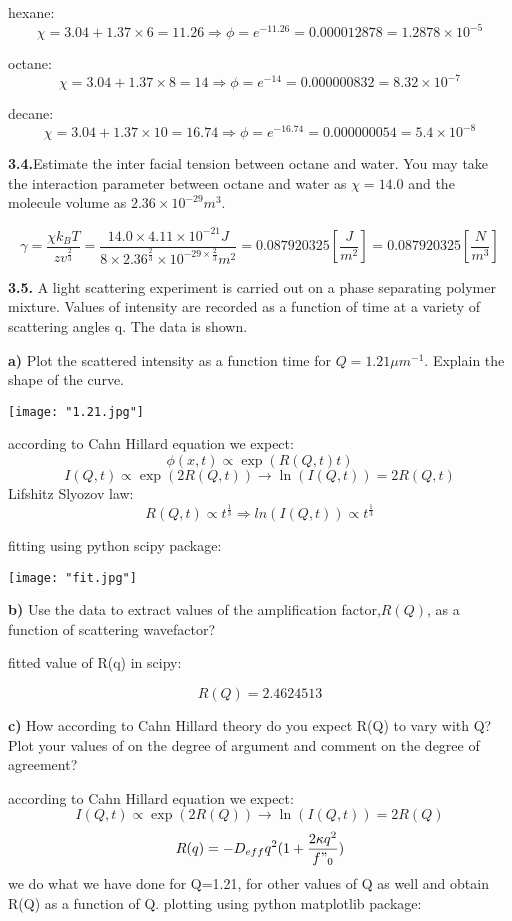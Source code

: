 \documentclass[a4paper,12pt]{report}
\begin{document}
hexane: \[
\chi = 3.04 + 1.37\times 6 = 11.26\Rightarrow \phi =
 e^{-11.26} = 0.000012878 =1.2878 \times 10^{-5}
\]

octane: \[
\chi = 3.04 + 1.37\times 8 = 14\Rightarrow \phi =
 e^{-14} = 0.000000832 = 8.32 \times 10^{-7}
\]

decane: \[
\chi = 3.04 + 1.37\times 10 = 16.74
\Rightarrow \phi = e^{-16.74} = 0.000000054 = 5.4\times 10^{-8}
\]

\textbf{3.4.}Estimate the inter facial tension between octane and water.
 You may take the interaction parameter between octane and 
 water as $\chi=14.0$ and the molecule volume as $2.36 \times 10^{-29} m^3$.

\[
\gamma =\frac{\chi k_B T}{z v^{\frac{2}{3}}} = 
\frac{14.0 \times 4.11 \times 10^{-21}J}{8 \times 2.36^{\frac{2}{3}} \times 10^{-29 \times \frac{2}{3} }m^2} = 0.087920325 [\frac{J}{m^2}] = 0.087920325 [\frac{N}{m^3}]
\]

\textbf{3.5.} A light scattering experiment is carried out on a phase separating polymer mixture.
 Values of intensity are recorded as a function of time at a variety of scattering angles q.
  The data is shown.

\textbf{a)} Plot the scattered intensity as a function time for $ Q = 1.21 \mu m^{-1}$.
 Explain the shape of the curve.

\texttt{[image: "1.21.jpg"]}

according to Cahn Hillard equation we expect:
\[
\phi(x,t) \propto \exp(R(Q,t)t)
\]
\[
I(Q,t) \propto \exp(2R(Q,t)) \to \ln(I(Q,t)) =2R(Q,t)
\]
Lifshitz Slyozov law:
\[
R(Q,t) \propto t^{\frac{1}{3}} \Rightarrow ln(I(Q,t)) \propto t^{\frac{1}{3}}
\]

fitting using python scipy package:

\texttt{[image: "fit.jpg"]}

\textbf{b)} Use the data to extract values of the amplification factor,$R(Q)$,
 as a function of scattering wavefactor?


fitted value of R(q) in scipy:

\[
R(Q) = 2.4624513 
\]

\textbf{c)}
How according to Cahn Hillard theory do you expect R(Q) to vary with Q?
Plot your values of on the degree of argument and comment on the degree of agreement?

according to Cahn Hillard equation we expect:
\[
I(Q,t) \propto \exp(2R(Q)) \to \ln(I(Q,t)) =2R(Q)
\]
\[
R(q) = -D_{eff} q^2 (1+\frac{2\kappa q^2}{f"_0})
\]
we do what we have done for Q=1.21, 
for other values of Q as well and obtain R(Q) as a function of Q.
plotting using python matplotlib package:
\end{document}
